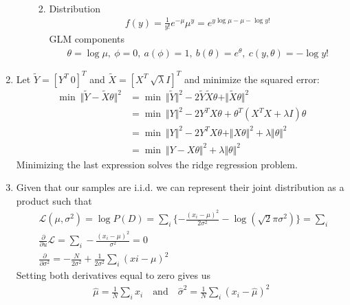 \documentclass[11pt,letter]{article}
\begin{document}
\begin{enumerate}
\begin{enumerate}
\begin{enumerate}
\begin{align*}
        \end{align*}
        \item Distribution 
        \begin{align*}
            f(y) = \frac{1}{y!}e^{-\mu}\mu^y = e^{y\log\mu - \mu - \log y!}
        \end{align*}
        GLM components
        \begin{align*}
            \theta = \log \mu, \ \phi = 0, \ a(\phi) = 1, \ b(\theta) = e^\theta, \ c(y,\theta) = -\log y!
        \end{align*}
        \end{enumerate}
    \end{enumerate}

\item Let $\tilde Y = [Y^T \ 0]^T$ and $\tilde X = [X^T \ \sqrt \lambda I]^T$ and minimize the squared error:
\begin{align*}
    \min \ \Vert \tilde Y - \tilde X \theta \Vert^2 & = \min \ \Vert \tilde Y \Vert^2 -2\tilde Y \tilde X \theta + \Vert \tilde X \theta \Vert^2 \\
    & = \min \ \Vert Y \Vert^2 - 2Y^TX\theta + \theta^T(X^TX + \lambda I)\theta \\
    & = \min \ \Vert Y \Vert^2 - 2Y^TX\theta + \Vert X \theta \Vert^2 + \lambda \Vert \theta \Vert^2 \\
    & = \min \ \Vert Y - X\theta \Vert^2 + \lambda \Vert \theta \Vert^2
\end{align*}
Minimizing the last expression solves the ridge regression problem.

\item Given that our samples are i.i.d. we can represent their joint distribution as a product such that
\begin{align*}
    & \mathcal L(\mu, \sigma^2) = \log P(D) = \sum_i \{-\frac{(x_i - \mu)^2}{2 \sigma^2} - \log(\sqrt 2 \pi \sigma^2)\} = \sum_i \ \\
    & \frac{\partial}{\partial u} \mathcal L = \sum_i -\frac{(x_i - \mu)^2}{\sigma^2} = 0 \\
    & \frac{\partial}{\partial \sigma^2} = -\frac{N}{2\sigma^2} + \frac{1}{2\sigma^2}\sum_i (xi - \mu)^2
\end{align*}
Setting both derivatives equal to zero gives us
\begin{align*}
    \hat \mu  = \frac{1}{N} \sum_i x_i \quad \text{and} \quad \hat \sigma^2 = \frac{1}{N} \sum_i (x_i - \hat \mu)^2
\end{align*}

\end{enumerate}
\end{document}
